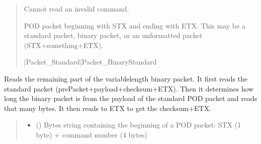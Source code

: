 \documentclass[letterpaper,10pt,english]{sphinxmanual}
\begin{document}
\begin{fulllineitems}
\begin{fulllineitems}
\begin{quote}
\begin{description}
\sphinxAtStartPar
{} \textendash{} Cannot read an invalid command.

\sphinxAtStartPar
POD packet beginning with STX and ending                 with ETX. This may be a standard packet, binary packet, or an unformatted packet                 (STX+something+ETX).

\sphinxAtStartPar
{\hyperref[\detokenize{PodApi.Packets:PodApi.Packets.Packet.Packet}]{}}|Packet\_Standard|Packet\_BinaryStandard

\end{description}\end{quote}

\end{fulllineitems}


\begin{fulllineitems}
\label{\detokenize{PodApi.Devices:PodApi.Devices.BasicPodProtocol.Pod._Read_Binary}}
\pysigstartsignatures
{}
\pysigstopsignatures
\sphinxAtStartPar
Reads the remaining part of the variable\sphinxhyphen{}length binary packet. It first reads the standard         packet (prePacket+payload+checksum+ETX). Then it determines how long the binary packet is from the         payload of the standard POD packet and reads that many bytes. It then reads to ETX to get the         checksum+ETX.
\begin{quote}\begin{description}
\begin{itemize}
\item {} 
\sphinxAtStartPar
{} () \textendash{} Bytes string containing the beginning of a POD packet: STX (1 byte)                 + command number (4 bytes)


\end{itemize}
\end{description}
\end{quote}
\end{fulllineitems}
\end{fulllineitems}
\end{document}
